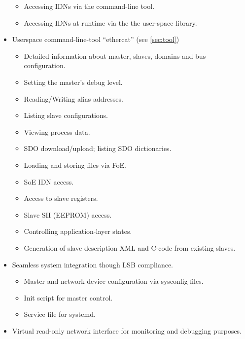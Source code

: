 \documentclass[a4paper,12pt,BCOR6mm,bibtotoc,idxtotoc]{scrbook}
\begin{document}
\begin{itemize}
\begin{itemize}
  \item Accessing IDNs via the command-line tool.

  \item Accessing IDNs at runtime via the the user-space library.

  \end{itemize}

\item Userspace command-line-tool ``ethercat'' (see \autoref{sec:tool})

  \begin{itemize}

  \item Detailed information about master, slaves, domains and bus
  configuration.
  \item Setting the master's debug level.
  \item Reading/Writing alias addresses.
  \item Listing slave configurations.
  \item Viewing process data.
  \item SDO download/upload; listing SDO dictionaries.
  \item Loading and storing files via FoE.
  \item SoE IDN access.
  \item Access to slave registers.
  \item Slave SII (EEPROM) access.
  \item Controlling application-layer states.
  \item Generation of slave description XML and C-code from existing slaves.

  \end{itemize}

\item Seamless system integration though LSB compliance.

  \begin{itemize}

  \item Master and network device configuration via sysconfig files.

  \item Init script for master control.

  \item Service file for systemd.

  \end{itemize}

\item Virtual read-only network interface for monitoring and debugging
  purposes.

\end{itemize}
\end{document}
